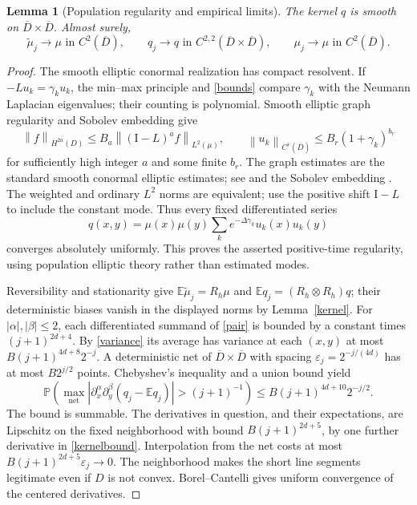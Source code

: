\documentclass[11pt]{article}
\newtheorem{lemma}[theorem]{Lemma}
\theoremstyle{remark}\newtheorem{remark}[theorem]{Remark}
\newcommand{\E}{\mathbb E}
\newcommand{\Prob}{\mathbb P}
\newcommand{\Id}{\mathrm I}
\newcommand{\norm}[1]{\left\lVert#1\right\rVert}
\begin{document}
\begin{lemma}[Population regularity and empirical limits]\label{empirical}
The kernel $q$ is smooth on $\overline D\times\overline D$. Almost surely,
\begin{equation}\label{strongkernellimit}
 \widetilde\mu_j\longrightarrow\mu\text{ in }C^2(\overline D),\qquad
 q_j\longrightarrow q\text{ in }C^{2,2}(\overline D\times\overline D),
 \qquad \mu_j\longrightarrow\mu\text{ in }C^2(\overline D).
\end{equation}
\end{lemma}
\begin{proof}
The smooth elliptic conormal realization has compact resolvent. If
$-Lu_k=\gamma_k u_k$, the min--max principle and \eqref{bounds} compare
$\gamma_k$ with the Neumann Laplacian eigenvalues; their counting is
polynomial. Smooth elliptic graph regularity and Sobolev embedding give
\begin{equation}\label{graph}
 \norm{f}_{H^{2a}(D)}\leq B_a\norm{(\Id-L)^a f}_{L^2(\mu)},
 \qquad
 \norm{u_k}_{C^r(\overline D)}\leq B_r(1+\gamma_k)^{b_r}
\end{equation}
for sufficiently high integer $a$ and some finite $b_r$. The graph estimates
are the standard smooth conormal elliptic estimates; see
\cite[Theorem~2.2 and Corollary~2.3]{grubb} and the Sobolev embedding
\cite[Corollary~6.12]{sobolev}. The weighted and ordinary $L^2$ norms are
equivalent; use the positive shift $\Id-L$ to include the constant mode.
Thus every fixed differentiated series
\[
 q(x,y)=\mu(x)\mu(y)\sum_k e^{-\Delta\gamma_k}u_k(x)u_k(y)
\]
converges absolutely uniformly. This proves the asserted positive-time
regularity, using population elliptic theory rather than estimated modes.

Reversibility and stationarity give
$\E\widetilde\mu_j=R_h\mu$ and
$\E q_j=(R_h\otimes R_h)q$; their deterministic biases vanish in the
displayed norms by Lemma~\ref{kernel}.
For $|\alpha|,|\beta|\leq2$, each differentiated summand of
\eqref{pair} is bounded by a constant times $(j+1)^{2d+4}$. By
\eqref{variance} its average has variance at each $(x,y)$ at most
$B(j+1)^{4d+8}2^{-j}$. A deterministic net of
$\overline D\times\overline D$ with spacing
$\varepsilon_j=2^{-j/(4d)}$ has at most $B2^{j/2}$ points.
Chebyshev's inequality and a union bound yield
\begin{equation}\label{pairprob}
 \Prob\!\left(\max_{\text{net}}|
 \partial_x^\alpha\partial_y^\beta(q_j-\E q_j)|>(j+1)^{-1}\right)
 \leq B(j+1)^{4d+10}2^{-j/2}.
\end{equation}
The bound is summable. The derivatives in question, and their expectations,
are Lipschitz on the fixed neighborhood with bound
$B(j+1)^{2d+5}$, by one further derivative in \eqref{kernelbound}.
Interpolation from the net costs at most
$B(j+1)^{2d+5}\varepsilon_j\to0$. The neighborhood makes the short line
segments legitimate even if $D$ is not convex. Borel--Cantelli gives
uniform convergence of the centered derivatives.


\end{proof}
\end{document}
